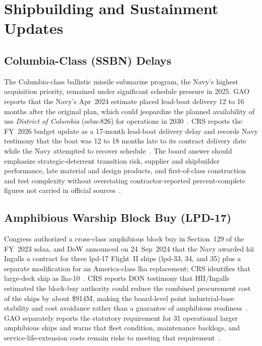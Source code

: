 \documentclass[../main.tex]{subfiles}
\begin{document}
\section{Shipbuilding and Sustainment Updates}

\subsection{Columbia-Class (SSBN) Delays}
The Columbia-class ballistic missile submarine program, the Navy's highest acquisition priority, remained under significant schedule pressure in 2025. GAO reports that the Navy's Apr~2024 estimate placed lead-boat delivery 12 to 16 months after the original plan, which could jeopardize the planned availability of \ac{uss} \textit{District of Columbia} (\ac{ssbn}-826) for operations in 2030~\autocite{gao-columbia-2024}. CRS reports the FY~2026 budget update as a 17-month lead-boat delivery delay and records Navy testimony that the boat was 12 to 18 months late to its contract delivery date while the Navy attempted to recover schedule~\autocite{crs-columbia-2026}. The board answer should emphasize strategic-deterrent transition risk, supplier and shipbuilder performance, late material and design products, and first-of-class construction and test complexity without overstating contractor-reported percent-complete figures not carried in official sources~\autocite{gao-columbia-2024,crs-columbia-2026}.

\subsection{Amphibious Warship Block Buy (LPD-17)}
Congress authorized a cross-class amphibious block buy in Section~129 of the FY~2023 \ac{ndaa}, and DoW announced on 24~Sep~2024 that the Navy awarded \ac{hii} Ingalls a contract for three \ac{lpd}-17 Flight~II ships (\ac{lpd}-33, 34, and 35) plus a separate modification for an America-class \ac{lha} replacement; CRS identifies that large-deck ship as \ac{lha}-10~\autocite{crs-amphib-ships-2026,dow-amphib-contracts-2024}. CRS reports DON testimony that HII/Ingalls estimated the block-buy authority could reduce the combined procurement cost of the ships by about \$914M, making the board-level point industrial-base stability and cost avoidance rather than a guarantee of amphibious readiness~\autocite{crs-amphib-ships-2026}. GAO separately reports the statutory requirement for 31 operational larger amphibious ships and warns that fleet condition, maintenance backlogs, and service-life-extension costs remain risks to meeting that requirement~\autocite{gao-amphib-2024}.
\end{document}
